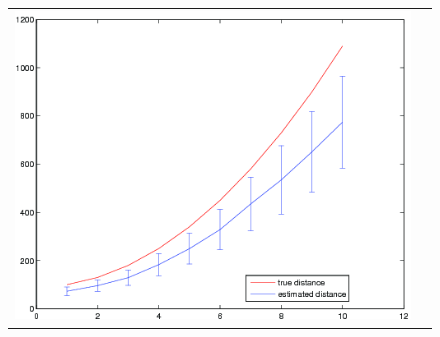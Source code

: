 \documentclass[runningheads]{llncs}
\begin{document}
\begin{figure}[ht]
\begin{tabular}{cc}
\includegraphics[width=.45\linewidth]{../resources/figures/errorbar_3q.png}
\end{tabular}
\end{figure}



\end{document}
